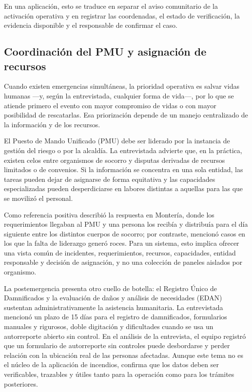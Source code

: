En una aplicación, esto se traduce en separar el aviso comunitario de la activación operativa y en registrar las coordenadas, el estado de verificación, la evidencia disponible y el responsable de confirmar el caso.

\subsection{Coordinación del PMU y asignación de recursos}

Cuando existen emergencias simultáneas, la prioridad operativa es salvar vidas humanas ---y, según la entrevistada, cualquier forma de vida---, por lo que se atiende primero el evento con mayor compromiso de vidas o con mayor posibilidad de rescatarlas. Esa priorización depende de un manejo centralizado de la información y de los recursos.

El Puesto de Mando Unificado (PMU) debe ser liderado por la instancia de gestión del riesgo o por la alcaldía. La entrevistada advierte que, en la práctica, existen celos entre organismos de socorro y disputas derivadas de recursos limitados o de convenios. Si la información se concentra en una sola entidad, las tareas pueden dejar de asignarse de forma equitativa y las capacidades especializadas pueden desperdiciarse en labores distintas a aquellas para las que se movilizó el personal.

Como referencia positiva describió la respuesta en Montería, donde los requerimientos llegaban al PMU y una persona los recibía y distribuía para el día siguiente entre los distintos cuerpos de socorro; por contraste, mencionó casos en los que la falta de liderazgo generó roces. Para un sistema, esto implica ofrecer una vista común de incidentes, requerimientos, recursos, capacidades, entidad responsable y decisión de asignación, y no una colección de paneles aislados por organismo.

La postemergencia presenta otro cuello de botella: el Registro Único de Damnificados y la evaluación de daños y análisis de necesidades (EDAN) sustentan administrativamente la asistencia humanitaria. La entrevistada mencionó un plazo de 15 días para el registro de damnificados, formularios manuales y rigurosos, doble digitación y dificultades cuando se usa un autorreporte abierto sin control. En el análisis de la entrevista, el equipo registró que un formulario de autorreporte sin controles puede desbordarse y perder relación con la ubicación real de las personas afectadas. Aunque este tema no es el núcleo de la aplicación de incendios, confirma que los datos deben ser verificables, trazables y útiles tanto para la operación como para los trámites posteriores.

